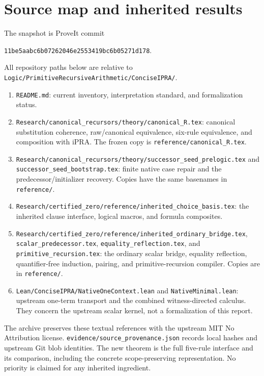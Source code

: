 \documentclass[11pt,letterpaper]{article}
\theoremstyle{definition}\newtheorem{definition}[theorem]{Definition}
\newcommand{\file}[1]{\texttt{\small\nolinkurl{#1}}}
\begin{document}
\section{Source map and inherited results}
The snapshot is ProveIt commit
\begin{center}\small\texttt{11be5aabc6b07262046e2553419bc6b05271d178}.\end{center}
All repository paths below are relative to
\file{Logic/PrimitiveRecursiveArithmetic/ConciseIPRA/}.
\begin{enumerate}
\item \file{README.md}: current inventory, interpretation standard, and formalization status.
\item \file{Research/canonical_recursors/theory/canonical_R.tex}: canonical substitution coherence, raw/canonical equivalence, six-rule equivalence, and composition with iPRA. The frozen copy is \file{reference/canonical_R.tex}.
\item \file{Research/canonical_recursors/theory/successor_seed_prelogic.tex} and \file{successor_seed_bootstrap.tex}: finite native case repair and the predecessor/initializer recovery. Copies have the same basenames in \file{reference/}.
\item \file{Research/certified_zero/reference/inherited_choice_basis.tex}: the inherited clause interface, logical macros, and formula composites.
\item \file{Research/certified_zero/reference/inherited_ordinary_bridge.tex}, \file{scalar_predecessor.tex}, \file{equality_reflection.tex}, and \file{primitive_recursion.tex}: the ordinary scalar bridge, equality reflection, quantifier-free induction, pairing, and primitive-recursion compiler. Copies are in \file{reference/}.
\item \file{Lean/ConciseIPRA/NativeOneContext.lean} and \file{NativeMinimal.lean}: upstream one-term transport and the combined witness-directed calculus. They concern the upstream scalar kernel, not a formalization of this report.
\end{enumerate}
The archive preserves these textual references with the upstream MIT No Attribution license. \file{evidence/source_provenance.json} records local hashes and upstream Git blob identities. The new theorem is the full five-rule interface and its comparison, including the concrete scope-preserving representation. No priority is claimed for any inherited ingredient.
\end{document}
